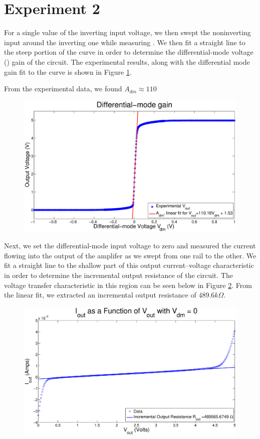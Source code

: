 \section*{Experiment 2}

For a single value of the inverting input voltage, we then swept the
noninverting input around the inverting one while measuring \Vout. We then fit
a straight line to the steep portion of the curve in order to determine the
differential-mode voltage (\Adm) gain of the circuit. The experimental results,
along with the differential mode gain fit to the curve is shown in Figure
\ref{fig:exp2p1}.

From the experimental data, we found $A_{dm} \approx 110$
\begin{figure}[H]
\centering
\includegraphics[width=\linewidth]{../Figures/Exp2P1.eps}
\caption{}
\label{fig:exp2p1}
\end{figure}

Next, we set the differential-mode input voltage to zero and measured the
current flowing into the output of the amplifer as we swept \Vout from one
rail to the other. We fit a straight line to the shallow part of this output
current–voltage characteristic in order to determine the incremental output
resistance of the circuit. The voltage transfer characteristic in this region
can be seen below in Figure \ref{fig:exp2p2}.
From the linear fit, we extracted an incremental output resistance of $489.6k\Omega$.




\begin{figure}[H]
\centering
\includegraphics[width=\linewidth]{../Figures/Exp2P2.eps}
\caption{}
\label{fig:exp2p2}
\end{figure}

